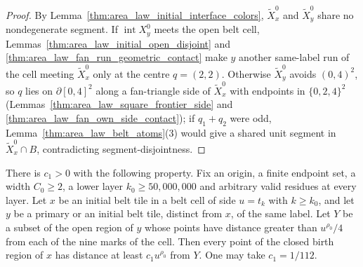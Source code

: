 \begin{proof}
    \leanok
    By Lemma~\ref{thm:area_law_initial_interface_colors}, $\tilde X_x^0$ and $\tilde X_y^0$ share no
    nondegenerate segment. If $\operatorname{int}X_y^0$ meets the open belt cell,
    Lemmas~\ref{thm:area_law_initial_open_disjoint} and \ref{thm:area_law_fan_run_geometric_contact}
    make $y$ another same-label run of the cell meeting $\tilde X_x^0$ only at the centre $q=(2,2)$.
    Otherwise $\tilde X_y^0$ avoids $(0,4)^2$, so $q$ lies on $\partial[0,4]^2$ along a fan-triangle side
    of $\tilde X_x^0$ with endpoints in $\{0,2,4\}^2$ (Lemmas~\ref{thm:area_law_square_frontier_side}
    and \ref{thm:area_law_fan_own_side_contact}); if $q_1+q_2$ were odd,
    Lemma~\ref{thm:area_law_belt_atoms}(3) would give a shared unit segment in $\tilde X_x^0\cap B$,
    contradicting segment-disjointness.
\end{proof}

\begin{lemma}
    \label{thm:area_law_initial_belt_birth_separation_local}
    \leanok
    There is $c_1>0$ with the following property. Fix an origin, a finite
    endpoint set, a width $C_0\ge2$, a lower layer $k_0\ge50{,}000{,}000$
    and arbitrary valid residues at every layer. Let $x$ be an initial belt
    tile in a belt cell of side $u=t_k$ with $k\ge k_0$, and let $y$ be a
    primary or an initial belt tile, distinct from $x$, of the same label. Let $Y$ be a
    subset of the open region of $y$ whose points have distance greater than
    $u^{\rho_0}/4$ from each of the nine marks of the cell. Then every point
    of the closed birth region of $x$ has distance at least $c_1u^{\rho_0}$
    from $Y$. One may take $c_1=1/112$.
\end{lemma}

